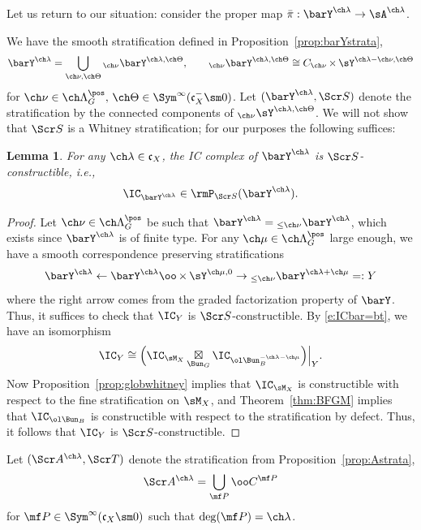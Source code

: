 \documentclass[final]{amsart}
\newtheorem{lem}[subsubsection]{Lemma}
\theoremstyle{remark}
\theoremstyle{definition}
\DeclareMathOperator*{\xt}{\times}
\DeclareMathOperator*{\bt}{\boxtimes}
\numberwithin{equation}{section}
\begin{document}
\subsubsection{}
Let us return to our situation: consider the proper map 
$\bar\pi : \barY^{\ch\lambda} \to \sA^{\ch\lambda}$.

We have the smooth stratification defined in Proposition~\ref{prop:barYstrata}, 
\[ \barY^{\ch\lambda} = \bigcup_{\ch\nu,\ch\Theta} 
{}_{\ch\nu}\barY^{\ch\lambda,\ch\Theta}, \qquad 
{_{\ch\nu}}\barY^{\ch\lambda,\ch\Theta} \cong 
C_{\ch\nu} \xt \sY^{\ch\lambda-\ch\nu,\ch\Theta} \] 
for $\ch\nu \in \ch\Lambda^\pos_G,\, 
\ch\Theta \in \Sym^\infty(\mathfrak c_X^-\sm 0)$.
Let $(\barY^{\ch\lambda},\Scr S)$ denote the stratification by
 the connected components of
$_{\ch\nu}\sY^{\ch\lambda, \ch\Theta}$.
We will not show that $\Scr S$ is a Whitney stratification; for our purposes 
the following suffices: 

\begin{lem} \label{lem:barICwhitney}
For any $\ch\lambda \in \mathfrak c_X$, 
the IC complex of $\barY^{\ch\lambda}$ is $\Scr S$-constructible, 
i.e., 
\[ \IC_{\barY^{\ch\lambda}} \in \rmP_{\Scr S}(\barY^{\ch\lambda}). \]
\end{lem}
\begin{proof} 
Let $\ch\nu \in \ch\Lambda^\pos_G$ be such that 
$\barY^{\ch\lambda} = {_{\le\ch\nu}}\barY^{\ch\lambda}$, which exists 
since $\barY^{\ch\lambda}$ is of finite type. 
For any $\ch\mu \in \ch\Lambda^\pos_G$ large enough, we have
a smooth correspondence preserving stratifications
\[ \barY^{\ch\lambda} \leftarrow \barY^{\ch\lambda}\oo\xt \sY^{\ch\mu,0} \to 
{_{\le\ch\nu}}\barY^{\ch\lambda+\ch\mu} =: Y\]
where the right arrow comes from the graded factorization property of $\barY$.
Thus, it suffices to check that 
$\IC_Y$ is $\Scr S$-constructible. 
By \eqref{e:ICbar=bt}, we have an isomorphism 
\[ \IC_Y \cong \Bigl.\Bigl(\IC_{\sM_X} \bt_{\Bun_G} \IC_{\ol\Bun_B^{-\ch\lambda-\ch\mu}}\Bigr)\Bigr|_Y. \] 
Now Proposition~\ref{prop:globwhitney} implies that 
$\IC_{\sM_X}$ is constructible with respect to the fine stratification on 
$\sM_X$, and Theorem~\ref{thm:BFGM} implies that $\IC_{\ol\Bun_B}$ is constructible
with respect to the stratification by defect. 
Thus, it follows that $\IC_Y$ is $\Scr S$-constructible.
\end{proof}


Let $(\Scr A^{\ch\lambda}, \Scr T)$ denote the stratification 
from Proposition~\ref{prop:Astrata}, 
\[ \Scr A^{\ch\lambda} = \bigcup_{\mf P} \oo C^{\mf P} \]
for $\mf P\in \Sym^\infty(\mathfrak c_X\sm 0)$ such that 
$\deg(\mf P)=\ch\lambda$.  
\end{document}

